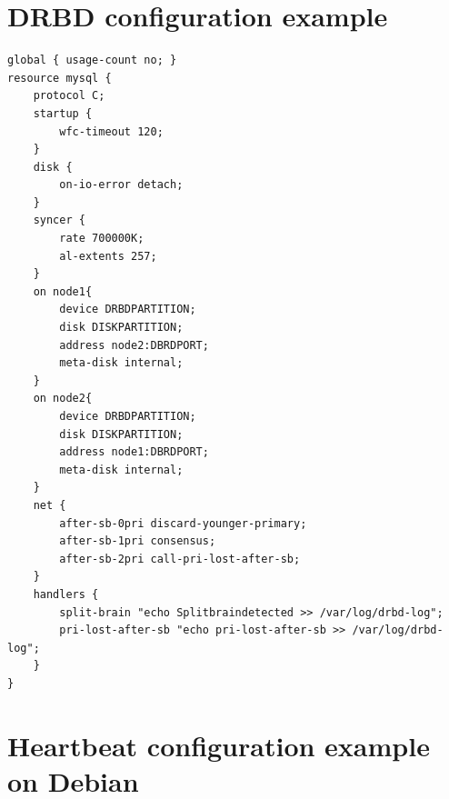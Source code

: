 \documentclass[a4paper,10pt]{report}
\begin{document}
\chapter{DRBD configuration example}
\label{drbdexample}
\begin{lstlisting}
global { usage-count no; }
resource mysql {
	protocol C;
	startup {
		wfc-timeout 120;
	}
	disk {
		on-io-error detach;
	}
	syncer {
		rate 700000K;
		al-extents 257;
	}
	on node1{
		device DRBDPARTITION;
		disk DISKPARTITION;
		address node2:DBRDPORT;
		meta-disk internal;
	}
	on node2{
		device DRBDPARTITION;
		disk DISKPARTITION;
		address node1:DBRDPORT;
		meta-disk internal;
	}
	net {
		after-sb-0pri discard-younger-primary;
		after-sb-1pri consensus;
 		after-sb-2pri call-pri-lost-after-sb;
	}
	handlers {
		split-brain "echo Splitbraindetected >> /var/log/drbd-log";
		pri-lost-after-sb "echo pri-lost-after-sb >> /var/log/drbd-log";
	}
}
\end{lstlisting}





\chapter{Heartbeat configuration example on Debian}
\label{cibexample}
\end{document}
